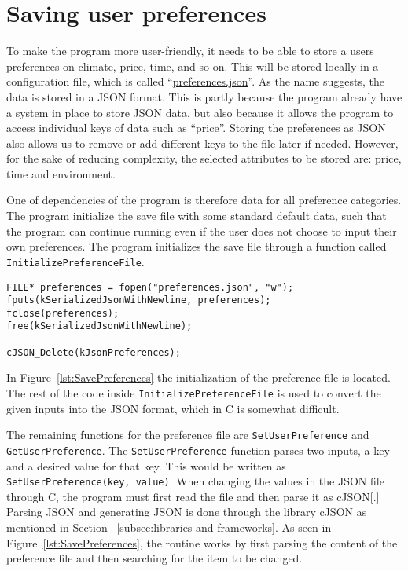 \section{Saving user preferences}\label{sec:saving-user-preferences}

To make the program more user-friendly, it needs to be able to store a users preferences on climate, price,
time, and so on.
This will be stored locally in a configuration file, which is called ``\url{preferences.json}''.
As the name suggests, the data is stored in a JSON format.
This is partly because the program already have a system in place to store JSON data, but also because it allows the
program to access individual keys of data such as ``price''.
Storing the preferences as JSON also allows us to remove or add different keys to the file later if needed.
However, for the sake of reducing complexity, the selected attributes to be stored are: price, time and environment.

One of dependencies of the program is therefore data for all preference categories.
The program initialize the save file with some standard default data, such that the program can continue running even if
the user does not choose to input their own preferences.
The program initializes the save file through a function called \texttt{InitializePreferenceFile}.

\begin{lstlisting}[label={lst:SavePreferences}, caption={Saving preferences to file.}]
FILE* preferences = fopen("preferences.json", "w");
fputs(kSerializedJsonWithNewline, preferences);
fclose(preferences);
free(kSerializedJsonWithNewline);

cJSON_Delete(kJsonPreferences);
\end{lstlisting}

In Figure~\ref{lst:SavePreferences} the initialization of the preference file is located.
The rest of the code inside \texttt{InitializePreferenceFile} is used to convert the given inputs into the JSON format,
which in C is somewhat difficult.

The remaining functions for the preference file are \texttt{SetUserPreference} and \texttt{GetUserPreference}.
The \texttt{SetUserPreference} function parses two inputs, a key and a desired value for that key.
This would be written as \texttt{SetUserPreference(key, value)}.
When changing the values in the JSON file through C, the program must first read the file and then parse it as cJSON[.]
Parsing JSON and generating JSON is done through the library cJSON as mentioned in Section
~\ref{subsec:libraries-and-frameworks}.
As seen in Figure~\ref{lst:SavePreferences}, the routine works by first parsing the content of the preference file and
then searching for the item to be changed.

